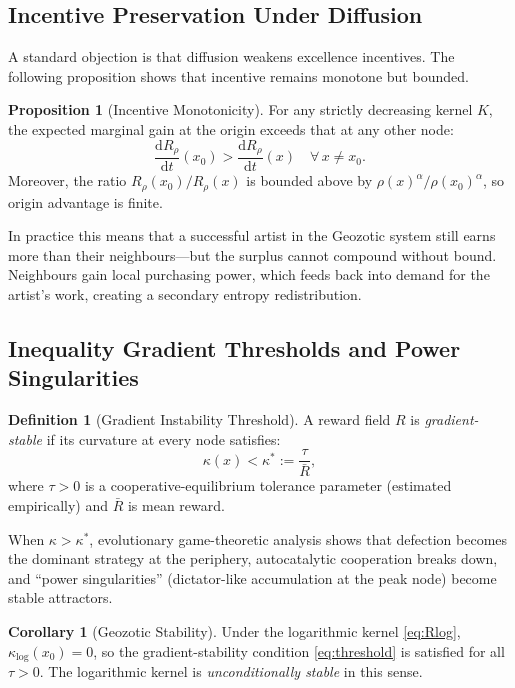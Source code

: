 \documentclass[12pt,a4paper]{article}
\theoremstyle{definition}
\newtheorem{definition}{Definition}[section]
\newtheorem{proposition}{Proposition}[section]
\newtheorem{corollary}{Corollary}[section]
\newcommand{\ddt}[1]{\frac{\mathrm{d}#1}{\mathrm{d}t}}
\begin{document}
\subsection{Incentive Preservation Under Diffusion}

A standard objection is that diffusion weakens excellence incentives.  The
following proposition shows that incentive remains monotone but bounded.

\begin{proposition}[Incentive Monotonicity]
  For any strictly decreasing kernel $K$, the expected marginal gain at the
  origin exceeds that at any other node:
  \begin{equation}
    \ddt{R_\rho}(x_0) > \ddt{R_\rho}(x) \quad \forall\, x \neq x_0.
  \end{equation}
  Moreover, the ratio $R_\rho(x_0)/R_\rho(x)$ is bounded above by
  $\rho(x)^\alpha / \rho(x_0)^\alpha$, so origin advantage is finite.
\end{proposition}

\noindent In practice this means that a successful artist in the Geozotic
system still earns more than their neighbours---but the surplus cannot
compound without bound.  Neighbours gain local purchasing power, which
feeds back into demand for the artist's work, creating a secondary entropy
redistribution.

\subsection{Inequality Gradient Thresholds and Power Singularities}

\begin{definition}[Gradient Instability Threshold]
  A reward field $R$ is \emph{gradient-stable} if its curvature at every node
  satisfies:
  \begin{equation}
    \kappa(x) < \kappa^* := \frac{\tau}{\bar{R}},
    \label{eq:threshold}
  \end{equation}
  where $\tau > 0$ is a cooperative-equilibrium tolerance parameter (estimated
  empirically) and $\bar{R}$ is mean reward.
\end{definition}

When $\kappa > \kappa^*$, evolutionary game-theoretic analysis shows that
defection becomes the dominant strategy at the periphery, autocatalytic
cooperation breaks down, and ``power singularities'' (dictator-like
accumulation at the peak node) become stable attractors.

\begin{corollary}[Geozotic Stability]
  Under the logarithmic kernel \eqref{eq:Rlog}, $\kappa_{\log}(x_0) = 0$,
  so the gradient-stability condition \eqref{eq:threshold} is satisfied for
  all $\tau > 0$.  The logarithmic kernel is \emph{unconditionally stable} in
  this sense.
\end{corollary}
\end{document}
